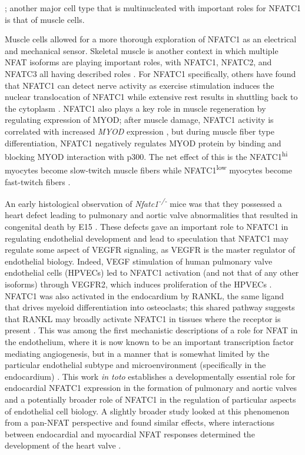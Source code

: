 \citep{Kim2008}; another major cell type that is multinucleated with important roles for NFATC1 is that of muscle cells. 

Muscle cells allowed for a more thorough exploration of NFATC1 as an electrical and mechanical sensor. Skeletal muscle is another context in which multiple NFAT isoforms are playing important roles, with NFATC1, NFATC2, and NFATC3 all having described roles \citep{Ehlers2014, Tothova2006, McCullagh2004, Delling2000, Amberg2004, Layne2008, Stevenson2001}. For NFATC1 specifically, others have found that NFATC1 can detect nerve activity as exercise stimulation induces the nuclear translocation of NFATC1 while extensive rest results in shuttling back to the cytoplasm \citep{Tothova2006}. NFATC1 also plays a key role in muscle regeneration by regulating expression of MYOD; after muscle damage, NFATC1 activity is correlated with increased \textit{MYOD} expression \citep{Sakuma2003}, but during muscle fiber type differentiation, NFATC1 negatively regulates MYOD protein by binding and blocking MYOD interaction with p300. The net effect of this is the NFATC1\textsuperscript{hi} myocytes become slow\hyp{}twitch muscle fibers while NFATC1\textsuperscript{low} myocytes become fast\hyp{}twitch fibers \citep{Ehlers2014}. 

An early histological observation of \textit{Nfatc1\textsuperscript{\hyp{}/\hyp{}}} mice was that they possessed a heart defect leading to pulmonary and aortic valve abnormalities that resulted in congenital death by E15 \citep{delaPompa1998, Ranger1998b}. These defects gave an important role to NFATC1 in regulating endothelial development and lead to speculation that NFATC1 may regulate some aspect of VEGFR signaling, as VEGFR is the master regulator of endothelial biology. Indeed, VEGF stimulation of human pulmonary valve endothelial cells (HPVECs) led to NFATC1 activation (and not that of any other isoforms) through VEGFR2, which induces proliferation of the HPVECs \citep{Johnson2003a}. NFATC1 was also activated in the endocardium by RANKL, the same ligand that drives myeloid differentiation into osteoclasts; this shared pathway suggests that RANKL may broadly activate NFATC1 in tissues where the receptor is present \citep{Combs2009}. This was among the first mechanistic descriptions of a role for NFAT in the endothelium, where it is now known to be an important transcription factor mediating angiogenesis, but in a manner that is somewhat limited by the particular endothelial subtype and microenvironment (specifically in the endocardium) \citep{Jang2010, Wu2012, Wu2013, Gunawan2020, Courtwright2009}. This work \textit{in toto} establishes a developmentally essential role for endocardial NFATC1 expression in the formation of pulmonary and aortic valves and a potentially broader role of NFATC1 in the regulation of particular aspects of endothelial cell biology. A slightly broader study looked at this phenomenon from a pan\hyp{}NFAT perspective and found similar effects, where interactions between endocardial and myocardial NFAT responses determined the development of the heart valve \citep{Chang2004}.

